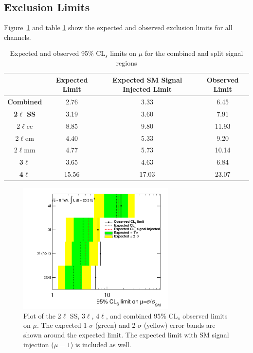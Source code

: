 \subsection{Exclusion Limits}

Figure~\ref{figure:results_limits} and table \ref{table:limits} show the expected and observed exclusion limits for all channels.


\begin{table}[h!]
\centering
\caption{Expected and observed 95\% CL$_s$ limits on $\mu$ for the combined and split signal regions}
\begin{tabular}{|c|c|c|c|}
\hline
& Expected Limit & Expected SM Signal Injected Limit  & Observed Limit\\ 
\hline
\textbf{Combined} & 2.76& 3.33& 6.45\\
\hline 
\textbf{2$\ell$ SS} & 3.19 &3.60 & 7.91 \\  
\hline
2$\ell$ee &8.85 &9.80 &11.93\\   
2$\ell$em &4.40 &5.33 &9.20\\
2$\ell$mm &4.77 &5.73 &10.14\\
\hline
\textbf{3$\ell$}  &3.65 &4.63 &6.84\\  
\hline
\textbf{4$\ell$}  &15.56 &17.03 &23.07\\  
\hline
\end{tabular}
\label{table:limits}
\end{table}

\begin{figure}[htbp]
\begin{center}
\includegraphics[width=0.7\textwidth]{figs/results/Limits_Obs.pdf}
\caption{Plot of the 2$\ell$ SS, 3$\ell$, 4$\ell$, and combined 95\% CL$_{s}$ observed limits on $\mu$. The expected 1-$\sigma$ (green) and 2-$\sigma$ (yellow) error bands are shown around
the expected limit. The expected limit with SM signal injection ($\mu=1$) is included as well.}
\label{figure:results_limits}
\end{center}
\end{figure}



